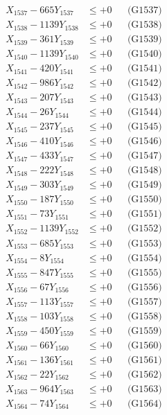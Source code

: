 \documentclass[a4paper,10pt]{article}
\begin{document}
{\begin{align}
X_{1537} - 665Y_{1537} &\leq +0 && \text{(G1537)} \\
X_{1538} - 1139Y_{1538} &\leq +0 && \text{(G1538)} \\
X_{1539} - 361Y_{1539} &\leq +0 && \text{(G1539)} \\
X_{1540} - 1139Y_{1540} &\leq +0 && \text{(G1540)} \\
\allowbreak
X_{1541} - 420Y_{1541} &\leq +0 && \text{(G1541)} \\
X_{1542} - 986Y_{1542} &\leq +0 && \text{(G1542)} \\
X_{1543} - 207Y_{1543} &\leq +0 && \text{(G1543)} \\
X_{1544} - 26Y_{1544} &\leq +0 && \text{(G1544)} \\
X_{1545} - 237Y_{1545} &\leq +0 && \text{(G1545)} \\
X_{1546} - 410Y_{1546} &\leq +0 && \text{(G1546)} \\
X_{1547} - 433Y_{1547} &\leq +0 && \text{(G1547)} \\
X_{1548} - 222Y_{1548} &\leq +0 && \text{(G1548)} \\
X_{1549} - 303Y_{1549} &\leq +0 && \text{(G1549)} \\
X_{1550} - 187Y_{1550} &\leq +0 && \text{(G1550)} \\
\allowbreak
X_{1551} - 73Y_{1551} &\leq +0 && \text{(G1551)} \\
X_{1552} - 1139Y_{1552} &\leq +0 && \text{(G1552)} \\
X_{1553} - 685Y_{1553} &\leq +0 && \text{(G1553)} \\
X_{1554} - 8Y_{1554} &\leq +0 && \text{(G1554)} \\
X_{1555} - 847Y_{1555} &\leq +0 && \text{(G1555)} \\
X_{1556} - 67Y_{1556} &\leq +0 && \text{(G1556)} \\
X_{1557} - 113Y_{1557} &\leq +0 && \text{(G1557)} \\
X_{1558} - 103Y_{1558} &\leq +0 && \text{(G1558)} \\
X_{1559} - 450Y_{1559} &\leq +0 && \text{(G1559)} \\
X_{1560} - 66Y_{1560} &\leq +0 && \text{(G1560)} \\
\allowbreak
X_{1561} - 136Y_{1561} &\leq +0 && \text{(G1561)} \\
X_{1562} - 22Y_{1562} &\leq +0 && \text{(G1562)} \\
X_{1563} - 964Y_{1563} &\leq +0 && \text{(G1563)} \\
X_{1564} - 74Y_{1564} &\leq +0 && \text{(G1564)} \\

\end{align}}
\end{document}
